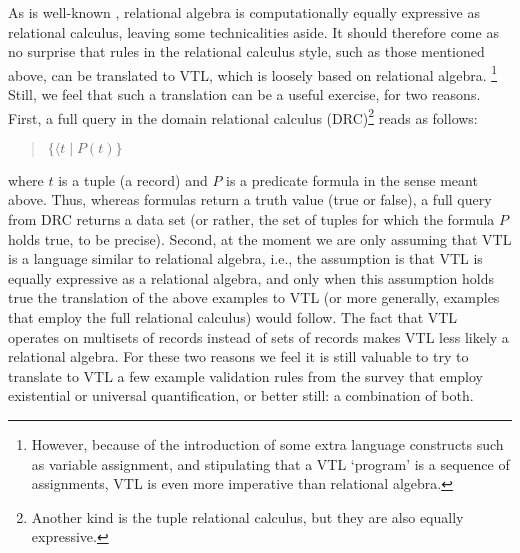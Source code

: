 As is well-known \cite{elmasri, abiteboul}, relational algebra is computationally equally expressive as relational calculus, leaving some technicalities aside. It should therefore come as no surprise that rules in the relational calculus style, such as those mentioned above, can be translated to VTL, which is loosely based on relational algebra. \footnote{However, because of the introduction of some extra language constructs such as variable assignment, and stipulating that a VTL `program' is a sequence of assignments, VTL is even more imperative than relational algebra.} Still, we feel that such a translation can be a useful exercise, for two reasons. First, a full query in the domain relational calculus (DRC)\footnote{Another kind is the tuple relational calculus, but they are also equally expressive.} reads as follows:
\begin{quote}
$\{\langle t \mid P(t)\}$
\end{quote}
where $t$ is a tuple (a record) and $P$ is a predicate formula in the sense meant above. Thus, whereas formulas return a truth value (true or false), a full query from DRC returns a data set (or rather, the set of tuples for which the formula $P$ holds true, to be precise). Second, at the moment we are only assuming that VTL is a language similar to relational algebra, i.e., the assumption is that VTL is equally expressive as a relational algebra, and only when this assumption holds true the translation of the above examples to VTL (or more generally, examples that employ the full relational calculus) would follow. The fact that VTL operates on multisets of records instead of sets of records makes VTL less likely a relational algebra. For these two reasons we feel it is still valuable to try to translate to VTL a few example validation rules from the survey that employ existential or universal quantification, or better still: a combination of both.

